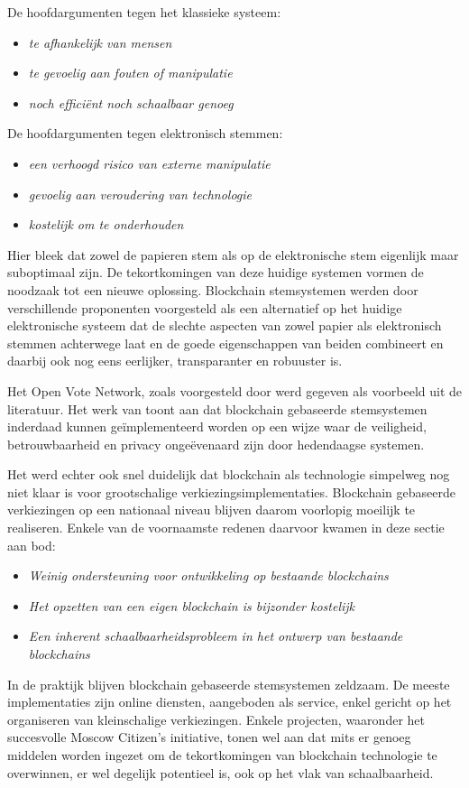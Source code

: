 	De hoofdargumenten tegen het klassieke systeem:
	\begin{itemize}
		\item\textit{te afhankelijk van mensen}
		\item\textit{te gevoelig aan fouten of manipulatie}
		\item\textit{noch efficiënt noch schaalbaar genoeg}
	\end{itemize}
	
	De hoofdargumenten tegen elektronisch stemmen:
	
	\begin{itemize}
		\item\textit{een verhoogd risico van externe manipulatie}
		\item\textit{gevoelig aan veroudering van technologie}
		\item\textit{kostelijk om te onderhouden}
	\end{itemize}
	
	Hier bleek dat zowel de papieren stem als op de elektronische stem eigenlijk maar suboptimaal zijn. De tekortkomingen van deze huidige systemen vormen de noodzaak tot een nieuwe oplossing. Blockchain stemsystemen werden door verschillende proponenten voorgesteld als een alternatief op het huidige elektronische systeem dat de slechte aspecten van zowel papier als elektronisch stemmen achterwege laat en de goede eigenschappen van beiden combineert en daarbij ook nog eens eerlijker, transparanter en robuuster is.
	
	Het Open Vote Network, zoals voorgesteld door \textcite{McCorry2017} werd gegeven als voorbeeld uit de literatuur. Het werk van \textcite{McCorry2017} toont aan dat blockchain gebaseerde stemsystemen inderdaad kunnen geïmplementeerd worden op een wijze waar de veiligheid, betrouwbaarheid en privacy ongeëvenaard zijn door hedendaagse systemen.
	
	Het werd echter ook snel duidelijk dat blockchain als technologie simpelweg nog niet klaar is voor grootschalige verkiezingsimplementaties. Blockchain gebaseerde verkiezingen op een nationaal niveau blijven daarom voorlopig moeilijk te realiseren.  Enkele van de voornaamste redenen daarvoor kwamen in deze sectie aan bod:
	\begin{itemize}
		\item\textit{Weinig ondersteuning voor ontwikkeling op bestaande blockchains}
		\item\textit{Het opzetten van een eigen blockchain is bijzonder kostelijk}
		\item\textit{Een inherent schaalbaarheidsprobleem in het ontwerp van bestaande blockchains}
	\end{itemize}
	In de praktijk blijven blockchain gebaseerde stemsystemen zeldzaam. De meeste implementaties zijn online diensten, aangeboden als service, enkel gericht op het organiseren van kleinschalige verkiezingen. Enkele projecten, waaronder het succesvolle Moscow Citizen's initiative, tonen wel aan dat mits er  genoeg middelen worden ingezet om de tekortkomingen van blockchain technologie te overwinnen, er wel degelijk potentieel is, ook op het vlak van schaalbaarheid.
	
